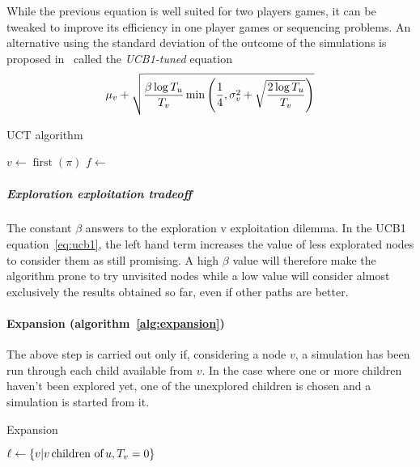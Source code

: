 \documentclass[oneside,twocolumn]{article}
\DeclareMathOperator{\argmax}{argmax}
\DeclareMathOperator{\first}{first}
\begin{document}
While the previous equation is well suited for two players games, it can be
tweaked to improve its efficiency in one player games or sequencing problems. An
alternative using the standard deviation of the outcome of the simulations is
proposed in~\cite{sebag2010fuse} called the \emph{UCB1-tuned} equation
\begin{equation}
  \mu_v +
  \sqrt{%
    \frac{\beta\log T_u}{T_v}
    \min\left( \frac{1}{4}, \sigma^2_v +
    \sqrt{%
      \frac{2 \log T_u}{T_v}
    }\right)
  }
\end{equation}
\begin{algorithm}
  \caption{UCT algorithm}\label{alg:tree_pol}
  \begin{algorithmic}
    \State{}\(v \gets \first(\pi)\)
    \State{}\Return{$\pi$}
    \Else{}
    \State{}
    \Else{}
    \State{}$f \gets$ 
    \State{}
    \EndIf{}
    \EndIf{}
    \EndFunction{}
  \end{algorithmic}
  \begin{algorithmic}
    \State{}\Return{$\argmax\{\Call{UCB}{v'} | v' \text{\,children of\,} v \}$}
    \EndFunction{}
  \end{algorithmic}
\end{algorithm}

\subparagraph{Exploration exploitation tradeoff} The constant \(\beta\) answers
to the exploration v exploitation dilemma. In the UCB1 equation~\ref{eq:ucb1},
the left hand term increases the value of less explorated nodes to consider them
as still promising. A high \(\beta\) value will therefore make the algorithm
prone to try unvisited nodes while a low value will consider almost exclusively
the results obtained so far, even if other paths are better.

\paragraph{Expansion (algorithm~\ref{alg:expansion})}
The above step is carried out only if, considering a node \(v\), a simulation
has been run through each child available from \(v\). In the case where one or
more children haven't been explored yet, one of the unexplored children is
chosen and a simulation is started from it.
\begin{algorithm}
  \caption{Expansion}\label{alg:expansion}
  \begin{algorithmic}
    \State{}$\ell \gets \{ v | v \text{\,children of\,} u, T_v = 0 \}$
    \State{}
    \EndFunction{}
  \end{algorithmic}
\end{algorithm}
\end{document}
